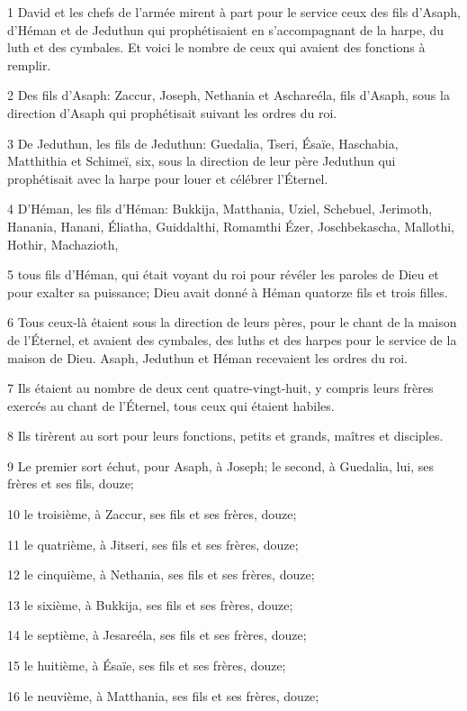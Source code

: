 \par 1 David et les chefs de l'armée mirent à part pour le service ceux des fils d'Asaph, d'Héman et de Jeduthun qui prophétisaient en s'accompagnant de la harpe, du luth et des cymbales. Et voici le nombre de ceux qui avaient des fonctions à remplir.
\par 2 Des fils d'Asaph: Zaccur, Joseph, Nethania et Aschareéla, fils d'Asaph, sous la direction d'Asaph qui prophétisait suivant les ordres du roi.
\par 3 De Jeduthun, les fils de Jeduthun: Guedalia, Tseri, Ésaïe, Haschabia, Matthithia et Schimeï, six, sous la direction de leur père Jeduthun qui prophétisait avec la harpe pour louer et célébrer l'Éternel.
\par 4 D'Héman, les fils d'Héman: Bukkija, Matthania, Uziel, Schebuel, Jerimoth, Hanania, Hanani, Éliatha, Guiddalthi, Romamthi Ézer, Joschbekascha, Mallothi, Hothir, Machazioth,
\par 5 tous fils d'Héman, qui était voyant du roi pour révéler les paroles de Dieu et pour exalter sa puissance; Dieu avait donné à Héman quatorze fils et trois filles.
\par 6 Tous ceux-là étaient sous la direction de leurs pères, pour le chant de la maison de l'Éternel, et avaient des cymbales, des luths et des harpes pour le service de la maison de Dieu. Asaph, Jeduthun et Héman recevaient les ordres du roi.
\par 7 Ils étaient au nombre de deux cent quatre-vingt-huit, y compris leurs frères exercés au chant de l'Éternel, tous ceux qui étaient habiles.
\par 8 Ils tirèrent au sort pour leurs fonctions, petits et grands, maîtres et disciples.
\par 9 Le premier sort échut, pour Asaph, à Joseph; le second, à Guedalia, lui, ses frères et ses fils, douze;
\par 10 le troisième, à Zaccur, ses fils et ses frères, douze;
\par 11 le quatrième, à Jitseri, ses fils et ses frères, douze;
\par 12 le cinquième, à Nethania, ses fils et ses frères, douze;
\par 13 le sixième, à Bukkija, ses fils et ses frères, douze;
\par 14 le septième, à Jesareéla, ses fils et ses frères, douze;
\par 15 le huitième, à Ésaïe, ses fils et ses frères, douze;
\par 16 le neuvième, à Matthania, ses fils et ses frères, douze;
